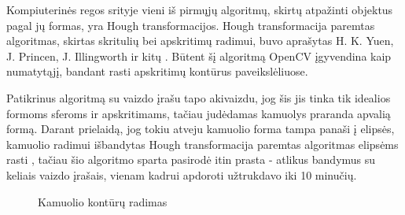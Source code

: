 \documentclass{VUMIFPSbakalaurinis}
\begin{document}
Kompiuterinės regos srityje vieni iš pirmųjų algoritmų, skirtų atpažinti objektus pagal jų formas, yra Hough transformacijos.
Hough transformacija paremtas algoritmas, skirtas skritulių bei apskritimų radimui, buvo aprašytas H. K. Yuen, J. Princen, J. Illingworth ir kitų \cite{YUEN199071}. Būtent šį algoritmą OpenCV įgyvendina kaip numatytąjį, bandant rasti apskritimų kontūrus paveikslėliuose.

Patikrinus algoritmą su vaizdo įrašu tapo akivaizdu, jog šis jis tinka tik idealios formoms sferoms ir apskritimams, tačiau judėdamas kamuolys praranda apvalią formą. Darant prielaidą, jog tokiu atveju kamuolio forma tampa panaši į elipsės, kamuolio radimui išbandytas Hough transformacija paremtas algoritmas elipsėms rasti \cite{1048464}, tačiau šio algoritmo sparta pasirodė itin prasta - atlikus bandymus su keliais vaizdo įrašais, vienam kadrui apdoroti užtrukdavo iki 10 minučių.

\begin{figure}[H]
	\centering
	\qquad
	\caption{Kamuolio kontūrų radimas}
	\label{fig:example}
\end{figure}
\end{document}
